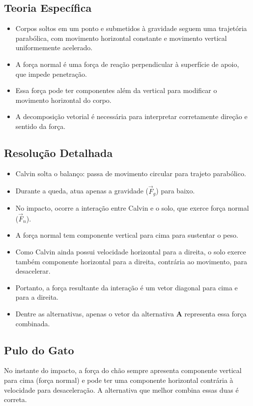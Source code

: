 \documentclass{article}
\begin{document}
\subsection*{Teoria Específica}
\begin{itemize}
  \item Corpos soltos em um ponto e submetidos à gravidade seguem uma trajetória parabólica, com movimento horizontal constante e movimento vertical uniformemente acelerado.
  \item A força normal é uma força de reação perpendicular à superfície de apoio, que impede penetração.
  \item Essa força pode ter componentes além da vertical para modificar o movimento horizontal do corpo.
  \item A decomposição vetorial é necessária para interpretar corretamente direção e sentido da força.
\end{itemize}

\subsection*{Resolução Detalhada}
\begin{itemize}
  \item Calvin solta o balanço: passa de movimento circular para trajeto parabólico.
  \item Durante a queda, atua apenas a gravidade ($\vec{F}_g$) para baixo.
  \item No impacto, ocorre a interação entre Calvin e o solo, que exerce força normal ($\vec{F}_n$).
  \item A força normal tem componente vertical para cima para sustentar o peso.
  \item Como Calvin ainda possui velocidade horizontal para a direita, o solo exerce também componente horizontal para a direita, contrária ao movimento, para desacelerar.
  \item Portanto, a força resultante da interação é um vetor diagonal para cima e para a direita.
  \item Dentre as alternativas, apenas o vetor da alternativa \textbf{A} representa essa força combinada.
\end{itemize}

\subsection*{Pulo do Gato}
No instante do impacto, a força do chão sempre apresenta componente vertical para cima (força normal) e pode ter uma componente horizontal contrária à velocidade para desaceleração. A alternativa que melhor combina essas duas é correta.
\end{document}
